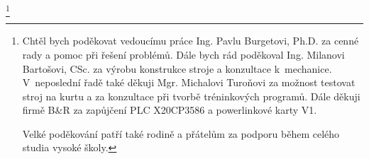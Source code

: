 \thanks {           %
   Chtěl bych poděkovat vedoucímu práce Ing. Pavlu Burgetovi, Ph.D. za cenné rady a pomoc při řešení problémů.
   Dále bych rád poděkoval Ing. Milanovi Bartošovi, CSc. za výrobu konstrukce stroje a konzultace k~mechanice.
   V~neposlední řadě také děkuji Mgr. Michalovi Turoňovi za možnost testovat stroj na 
kurtu a za konzultace při tvorbě tréninkových programů. Dále děkuji firmě B\&R za zapůjčení PLC X20CP3586 a powerlinkové karty V1. 

Velké poděkování patří také rodině a přátelům za podporu během celého studia vysoké školy.
   
}



\makefront  %



\bye
